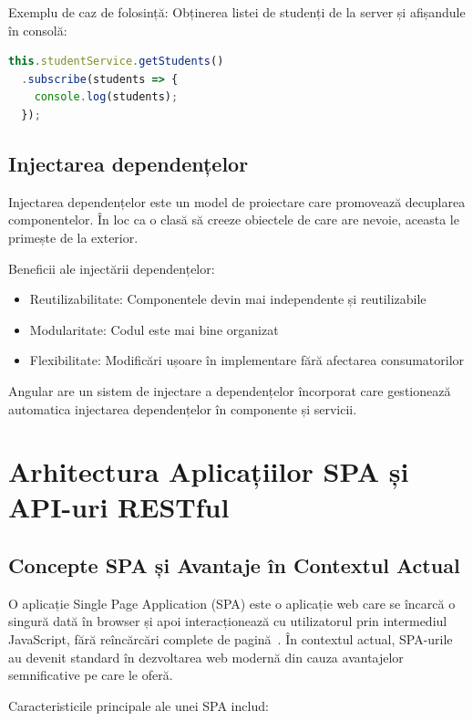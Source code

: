 \documentclass[conference]{IEEEtran}
\begin{document}
Exemplu de caz de folosință: Obținerea listei de studenți de la server și
afișandule în consolă:

\begin{lstlisting}[language=TypeScript]
this.studentService.getStudents()
  .subscribe(students => {
    console.log(students);
  });
\end{lstlisting}

\subsection{Injectarea dependențelor}

Injectarea dependențelor este un model de proiectare care promovează decuplarea
componentelor. În loc ca o clasă să creeze obiectele de care are nevoie,
aceasta le primește de la exterior.

Beneficii ale injectării dependențelor:
\begin{itemize}
    \item Reutilizabilitate: Componentele devin mai independente și reutilizabile
    \item Modularitate: Codul este mai bine organizat
    \item Flexibilitate: Modificări ușoare în implementare fără afectarea consumatorilor
\end{itemize}

Angular are un sistem de injectare a dependențelor încorporat care gestionează
automatica injectarea dependențelor în componente și servicii.

\section{Arhitectura Aplicațiilor SPA și API-uri RESTful}

\subsection{Concepte SPA și Avantaje în Contextul Actual}

O aplicație Single Page Application (SPA) este o aplicație web care se încarcă
o singură dată în browser și apoi interacționează cu utilizatorul prin
intermediul JavaScript, fără reîncărcări complete de pagină~\cite{SPABook2024}.
În contextul actual, SPA-urile au devenit standard în dezvoltarea web modernă
din cauza avantajelor semnificative pe care le oferă.

Caracteristicile principale ale unei SPA includ:
\end{document}
